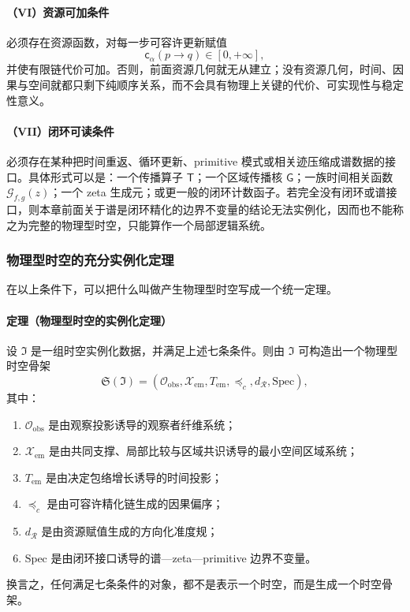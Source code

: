 \paragraph{（VI）资源可加条件}
必须存在资源函数，对每一步可容许更新赋值
\[
\mathsf c_\alpha(p\to q)\in [0,+\infty],
\]
并使有限链代价可加。否则，前面资源几何就无从建立；没有资源几何，时间、因果与空间就都只剩下纯顺序关系，而不会具有物理上关键的代价、可实现性与稳定性意义。

\paragraph{（VII）闭环可读条件}
必须存在某种把时间重返、循环更新、primitive 模式或相关迹压缩成谱数据的接口。具体形式可以是：一个传播算子 \(\mathsf T\)；一个区域传播核 \(\mathsf G\)；一族时间相关函数 \(\mathcal G_{f,g}(z)\)；一个 zeta 生成元；或更一般的闭环计数函子。若完全没有闭环或谱接口，则本章前面关于谱是闭环精化的边界不变量的结论无法实例化，因而也不能称之为完整的物理型时空，只能算作一个局部逻辑系统。

\subsubsection{物理型时空的充分实例化定理}

在以上条件下，可以把什么叫做产生物理型时空写成一个统一定理。

\paragraph{定理（物理型时空的实例化定理）}
设 \(\mathfrak I\) 是一组时空实例化数据，并满足上述七条条件。则由 \(\mathfrak I\) 可构造出一个物理型时空骨架
\[
\mathfrak S(\mathfrak I)=
(\mathcal O_{\mathrm{obs}},
\mathcal X_{\mathrm{em}},
T_{\mathrm{em}},
\preceq_c,
d_{\mathcal R},
\mathrm{Spec}),
\]
其中：
\begin{enumerate}
  \item \(\mathcal O_{\mathrm{obs}}\) 是由观察投影诱导的观察者纤维系统；
  \item \(\mathcal X_{\mathrm{em}}\) 是由共同支撑、局部比较与区域共识诱导的最小空间区域系统；
  \item \(T_{\mathrm{em}}\) 是由决定包络增长诱导的时间投影；
  \item \(\preceq_c\) 是由可容许精化链生成的因果偏序；
  \item \(d_{\mathcal R}\) 是由资源赋值生成的方向化准度规；
  \item \(\mathrm{Spec}\) 是由闭环接口诱导的谱—zeta—primitive 边界不变量。
\end{enumerate}
换言之，任何满足七条条件的对象，都不是表示一个时空，而是生成一个时空骨架。

